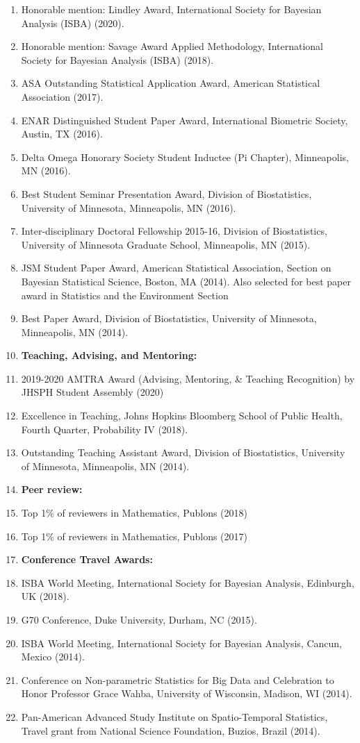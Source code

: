 \documentclass[10pt]{article}
\newcommand{\mydot}[1]{\begin{enumerate}[label=$\circ$,leftmargin=\parindent]\setlength{\itemsep}{#1}}
\newcommand{\ee}{\end{enumerate}}
\begin{document}
\mydot{-0.1em}
\item Honorable mention: Lindley Award, International Society
for Bayesian Analysis (ISBA) (2020).
\item Honorable mention: Savage Award Applied Methodology, International Society
for Bayesian Analysis (ISBA) (2018).
\item ASA Outstanding Statistical Application Award, American Statistical
Association (2017).
\item ENAR Distinguished Student Paper Award, International Biometric Society,
Austin, TX (2016).
\item Delta Omega Honorary Society Student Inductee (Pi Chapter), Minneapolis,
MN (2016).
\item Best Student Seminar Presentation Award, Division of Biostatistics, University
of Minnesota, Minneapolis, MN (2016).
\item Inter-disciplinary Doctoral Fellowship 2015-16, Division of Biostatistics, University
of Minnesota Graduate School, Minneapolis, MN (2015).
\item JSM Student Paper Award, American Statistical Association, Section on
Bayesian Statistical Science, Boston, MA (2014).
Also selected for best paper award in Statistics and the Environment Section
\item Best Paper Award, Division of Biostatistics, University of Minnesota, Minneapolis,
MN (2014).\\
\item \textbf{Teaching, Advising, and Mentoring:} 
\item 2019-2020 AMTRA Award (Advising, Mentoring, \& Teaching Recognition) by JHSPH Student Assembly (2020)
\item Excellence in Teaching, Johns Hopkins Bloomberg School of Public Health,
Fourth Quarter, Probability IV (2018).
\item Outstanding Teaching Assistant Award, Division of Biostatistics, University of
Minnesota, Minneapolis, MN (2014).\\
\item \textbf{Peer review:} 
\item Top 1\% of reviewers in Mathematics, Publons (2018)
\item Top 1\% of reviewers in Mathematics, Publons (2017)\\
\item \textbf{Conference Travel Awards:} 
\item ISBA World Meeting, International Society for Bayesian Analysis, Edinburgh, UK (2018).
\item G70 Conference, Duke University, Durham, NC (2015).
\item ISBA World Meeting, International Society for Bayesian Analysis, Cancun,
Mexico (2014).
\item Conference on Non-parametric Statistics for Big Data and Celebration to Honor
Professor Grace Wahba, University of Wisconsin, Madison, WI (2014).
\item Pan-American Advanced Study Institute on Spatio-Temporal Statistics, Travel
grant from National Science Foundation, Buzios, Brazil (2014).
\ee
\end{document}

